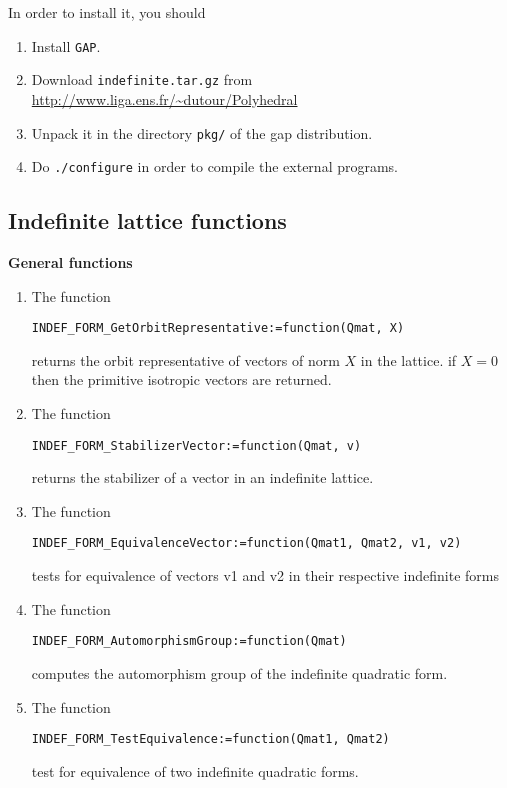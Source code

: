 \documentclass[12pt]{amsart}
\begin{document}
In order to install it, you should
\begin{enumerate}
\item Install {\tt GAP}.
\item Download {\tt indefinite.tar.gz} from 
{\url{http://www.liga.ens.fr/~dutour/Polyhedral}}
\item Unpack it in the directory {\tt pkg/} of the gap distribution.
\item Do {\tt ./configure} in order to compile the external programs.
\end{enumerate}




\subsection{Indefinite lattice functions}

{\bf General functions}
\begin{enumerate}
\item The function
\begin{verbatim}
INDEF_FORM_GetOrbitRepresentative:=function(Qmat, X)
\end{verbatim}
returns the orbit representative of vectors of norm $X$ in the lattice. if $X=0$ then the primitive isotropic vectors are returned.
\item The function
\begin{verbatim}
INDEF_FORM_StabilizerVector:=function(Qmat, v)
\end{verbatim}
returns the stabilizer of a vector in an indefinite lattice.
\item The function
\begin{verbatim}
INDEF_FORM_EquivalenceVector:=function(Qmat1, Qmat2, v1, v2)
\end{verbatim}
tests for equivalence of vectors v1 and v2 in their respective indefinite forms
\item The function
\begin{verbatim}
INDEF_FORM_AutomorphismGroup:=function(Qmat)
\end{verbatim}
computes the automorphism group of the indefinite quadratic form.
\item The function
\begin{verbatim}
INDEF_FORM_TestEquivalence:=function(Qmat1, Qmat2)
\end{verbatim}
test for equivalence of two indefinite quadratic forms.
\end{enumerate}
\end{document}
